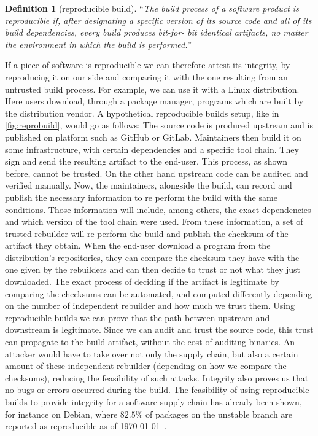 \documentclass[a4paper,11pt,oneside]{report}
\theoremstyle{definition}
\newtheorem{definition}{Definition}[section]
\newcommand{\rb}{reproducible builds\xspace}
\begin{document}
\begin{definition}[reproducible build]
\label{def:reprobuild}
``\emph{The build process of a software
product is reproducible if, after designating a
specific version of its source code and all of its
build dependencies, every build produces bit-for-
bit identical artifacts, no matter the environment
in which the build is performed.}''~\cite{DBLP:journals/corr/abs-2104-06020}
\end{definition}

If a piece of software is reproducible we can therefore attest its integrity,
by reproducing it on our side and comparing it with the one resulting from an
untrusted build process. For example, we can use it with a Linux distribution.
Here users download, through a package manager, programs which are built by the
distribution vendor. A hypothetical \rb setup, like in
\autoref{fig:reprobuild}, would go as follows: The source code is produced
upstream and is published on platform such as GitHub or GitLab. Maintainers
then build it on some infrastructure, with certain dependencies and a specific
tool chain. They sign and send the resulting artifact to the end-user. This
process, as shown before, cannot be trusted. On the other hand upstream code
can be audited and verified manually. Now, the maintainers, alongside the
build, can record and publish the necessary information to re perform the build
with the same conditions. Those information will include, among others, the
exact dependencies and which version of the tool chain were used. From these
information, a set of trusted rebuilder will re perform the build and publish
the checksum of the artifact they obtain. When the end-user download a program
from the distribution's repositories, they can compare the checksum they have
with the one given by the rebuilders and can then decide to trust or not what
they just downloaded. The exact process of deciding if the artifact is
legitimate by comparing the checksums can be automated, and computed
differently depending on the number of independent rebuilder and how much we
trust them.
Using \rb we can prove that the path between upstream and downstream is
legitimate. Since we can audit and trust the source code, this trust can
propagate to the build artifact, without the cost of auditing binaries. An
attacker would have to take over not only the supply chain, but also a certain
amount of these independent rebuilder (depending on how we compare the
checksums), reducing the feasibility of such attacks. Integrity also proves us
that no bugs or errors occurred during the build. The feasibility of using \rb
to provide integrity for a software supply chain has already been shown, for
instance on Debian, where $82.5\%$ of packages on the unstable branch are
reported as reproducible as of \today~\cite{debian:repro}.
\end{document}
